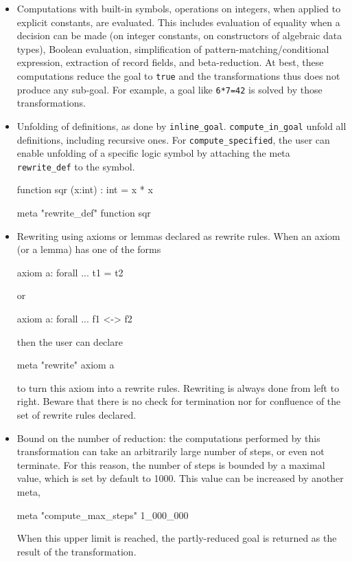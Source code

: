 
\begin{itemize}
\item Computations with built-in symbols, \eg operations on integers,
  when applied to explicit constants, are evaluated. This includes
  evaluation of equality when a decision can be made (on integer
  constants, on constructors of algebraic data types), Boolean
  evaluation, simplification of pattern-matching/conditional expression,
  extraction of record fields, and beta-reduction.
  At best, these computations reduce the goal to
  \verb|true| and the transformations thus does not produce any sub-goal.
  For example, a goal
  like \verb|6*7=42| is solved by those transformations.
\item Unfolding of definitions, as done by \verb|inline_goal|.
  \verb|compute_in_goal| unfold all definitions, including recursive ones.
  For \verb|compute_specified|, the user can enable unfolding of a specific
  logic symbol by attaching the meta \verb|rewrite_def| to the symbol.
\begin{whycode}
function sqr (x:int) : int = x * x

meta "rewrite_def" function sqr
\end{whycode}
\item Rewriting using axioms or lemmas declared as rewrite rules. When
  an axiom (or a lemma) has one of the forms
\begin{whycode}
axiom a: forall ... t1 = t2
\end{whycode}
  or
\begin{whycode}
axiom a: forall ... f1 <-> f2
\end{whycode}
  then the user can declare
\begin{whycode}
meta "rewrite" axiom a
\end{whycode}
  to turn this axiom into a rewrite rules. Rewriting is always done
  from left to right. Beware that there is no check for termination
  nor for confluence of the set of rewrite rules declared.
\item Bound on the number of reduction: the computations performed by
  this transformation can take an arbitrarily large number of steps,
  or even not terminate. For this reason, the number of steps is
  bounded by a maximal value, which is set by default to 1000. This
  value can be increased by another meta, \eg
\begin{whycode}
meta "compute_max_steps" 1_000_000
\end{whycode}
  When this upper limit is reached, the partly-reduced goal
  is returned as the result of the transformation.
\end{itemize}



